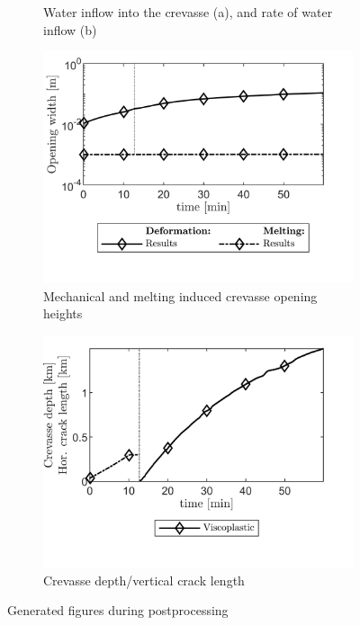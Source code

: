 \documentclass[3p]{elsarticle} %
\begin{document}
\begin{figure}
\begin{subfigure}[b]{8cm}
         \caption{Water inflow into the crevasse (a), and rate of water inflow (b)}
         \label{fig:4}
     \end{subfigure}
     \begin{subfigure}[b]{8cm}
         \centering
         \includegraphics{../Figures/OpeningHeights.png}
         \caption{Mechanical and melting induced crevasse opening heights}
         \label{fig:5}
     \end{subfigure}
     \begin{subfigure}[b]{8cm}
         \centering
         \includegraphics{../Figures/FractureLengths.png}
         \caption{Crevasse depth/vertical crack length}
         \label{fig:6}
     \end{subfigure}
     \caption{Generated figures during postprocessing}
     \label{fig:results}
\end{figure}
\end{document}
